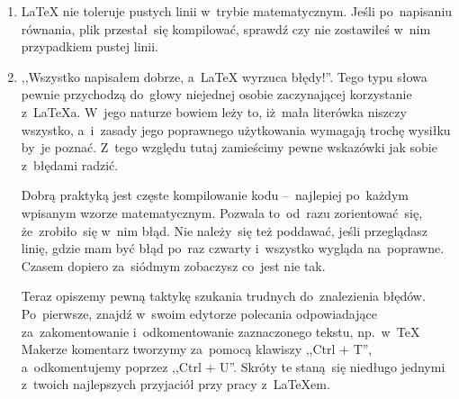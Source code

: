 \documentclass[a4paper,11pt]{article}
\newcommand{\tbs}{\textbackslash}  %
\begin{document}
\begin{enumerate}
  odstępu w~tekście, lecz polecenie zakończenia komendy. Skutkiem tego
  \begin{quote}
    \texttt{Używaj \tbs LaTeX a z~uwagą.}
  \end{quote}
  daje pożądany tekst
  \begin{quote}
    Używaj \LaTeX a z~uwagą.
  \end{quote}
  Jednak już
  \begin{quote}
    \texttt{\tbs LaTeX to~potężne narzędzie.}
  \end{quote}
  daje
  \begin{quote}
    \LaTeX to~potężne narzędzie.
  \end{quote}
  Aby uniknąć tego typu problemów należy komendy po~których ma~być
  odstęp kończyć \texttt{\{\}}. Przykładowo
  \begin{displayquote}
    \texttt{\tbs LaTeX\{\} to~potężne narzędzie.}
  \end{displayquote}
  wyświetli tekst
  \begin{displayquote}
    \LaTeX{} to~potężne narzędzie.
  \end{displayquote}
\item \LaTeX{} nie toleruje pustych linii w~trybie matematycznym.
  Jeśli po~napisaniu równania, plik przestał~się kompilować, sprawdź
  czy nie zostawiłeś w~nim przypadkiem pustej linii.
\item ,,Wszystko napisałem dobrze, a~\LaTeX{} wyrzuca błędy!''. Tego
  typu słowa pewnie przychodzą do~głowy niejednej osobie zaczynającej
  korzystanie z~\LaTeX a. W~jego naturze bowiem leży to, iż~mała
  literówka niszczy wszystko, a~i~zasady jego poprawnego użytkowania
  wymagają trochę wysiłku by~je poznać. Z~tego względu tutaj
  zamieścimy pewne wskazówki jak sobie z~błędami radzić.

  Dobrą praktyką jest częste kompilowanie kodu --~najlepiej po~każdym
  wpisanym wzorze matematycznym. Pozwala to~od~razu zorientować~się,
  że~zrobiło~się w~nim błąd. Nie należy~się też poddawać, jeśli
  przeglądasz linię, gdzie mam być błąd po~raz czwarty i~wszystko
  wygląda na~poprawne. Czasem dopiero za~siódmym zobaczysz co~jest nie
  tak.

  Teraz opiszemy pewną taktykę szukania trudnych do~znalezienia
  błędów. Po~pierwsze, znajdź w~swoim edytorze polecania odpowiadające
  za~zakomentowanie i~odkomentowanie zaznaczonego tekstu, np.~w~\TeX
  Makerze komentarz tworzymy za~pomocą klawiszy ,,Ctrl + T'',
  a~odkomentujemy poprzez ,,Ctrl + U''. Skróty te staną~się niedługo
  jednymi z~twoich najlepszych przyjaciół przy pracy z~\LaTeX em.


\end{enumerate}
\end{document}
